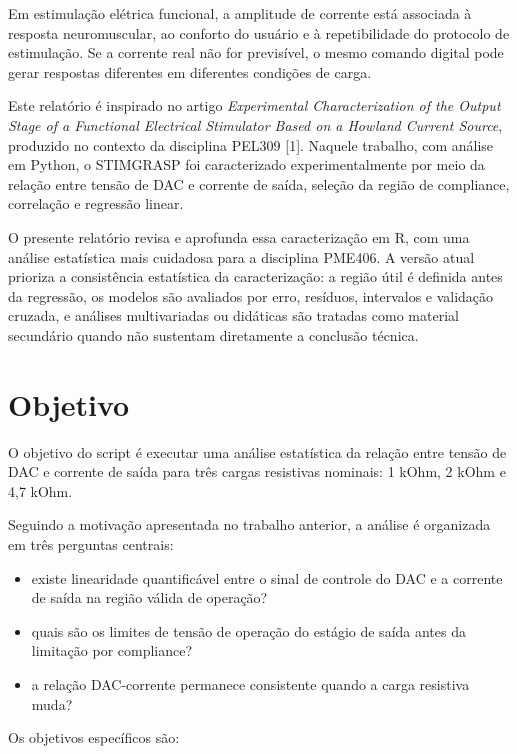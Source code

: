 \documentclass[
  brazilian,
]{article}
\providecommand{\tightlist}{%
  \setlength{\itemsep}{0pt}\setlength{\parskip}{0pt}}
\renewcommand{\_}{\oldunderscore\discretionary{}{}{}}
\begin{document}
Em estimulação elétrica funcional, a amplitude de corrente está
associada à resposta neuromuscular, ao conforto do usuário e à
repetibilidade do protocolo de estimulação. Se a corrente real não for
previsível, o mesmo comando digital pode gerar respostas diferentes em
diferentes condições de carga.

Este relatório é inspirado no artigo \emph{Experimental Characterization
of the Output Stage of a Functional Electrical Stimulator Based on a
Howland Current Source}, produzido no contexto da disciplina PEL309
{[}1{]}. Naquele trabalho, com análise em Python, o STIMGRASP foi
caracterizado experimentalmente por meio da relação entre tensão de DAC
e corrente de saída, seleção da região de compliance, correlação e
regressão linear.

O presente relatório revisa e aprofunda essa caracterização em R, com
uma análise estatística mais cuidadosa para a disciplina PME406. A
versão atual prioriza a consistência estatística da caracterização: a
região útil é definida antes da regressão, os modelos são avaliados por
erro, resíduos, intervalos e validação cruzada, e análises multivariadas
ou didáticas são tratadas como material secundário quando não sustentam
diretamente a conclusão técnica.

\section{Objetivo}\label{objetivo}

O objetivo do script é executar uma análise estatística da relação entre
tensão de DAC e corrente de saída para três cargas resistivas nominais:
1 kOhm, 2 kOhm e 4,7 kOhm.

Seguindo a motivação apresentada no trabalho anterior, a análise é
organizada em três perguntas centrais:

\begin{itemize}
\tightlist
\item
  existe linearidade quantificável entre o sinal de controle do DAC e a
  corrente de saída na região válida de operação?
\item
  quais são os limites de tensão de operação do estágio de saída antes
  da limitação por compliance?
\item
  a relação DAC-corrente permanece consistente quando a carga resistiva
  muda?
\end{itemize}

Os objetivos específicos são:
\end{document}
